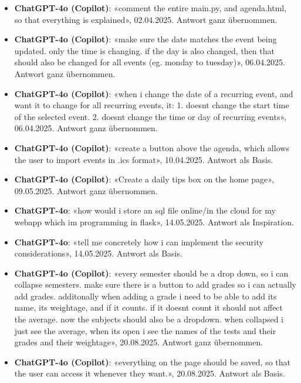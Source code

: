 \documentclass[12pt, a4paper]{article}
\begin{document}
\begin{itemize}
    \item \textbf{ChatGPT-4o (Copilot)}: «comment the entire main.py, and agenda.html, so that everything is explained», 02.04.2025. Antwort ganz übernommen.
    
    \item \textbf{ChatGPT-4o (Copilot)}: «make sure the date matches the event being updated. only the time is changing. if the day is also changed, then that should also be changed for all events (eg. monday to tuesday)», 06.04.2025. Antwort ganz übernommen.
    
    \item \textbf{ChatGPT-4o (Copilot)}: «when i change the date of a recurring event, and want it to change for all recurring events, it: 1. doesnt change the start time of the selected event. 2. doesnt change the time or day of recurring events», 06.04.2025. Antwort ganz übernommen.
    
    \item \textbf{ChatGPT-4o (Copilot)}: «create a button above the agenda, which allows the user to import events in .ics format», 10.04.2025. Antwort als Basis.
    
    \item \textbf{ChatGPT-4o (Copilot)}: «Create a daily tips box on the home page», 09.05.2025. Antwort ganz übernommen.
    
    \item \textbf{ChatGPT-4o}: «how would i store an sql file online/in the cloud for my webapp which im programming in flask», 14.05.2025. Antwort als Inspiration.
    
    \item \textbf{ChatGPT-4o}: «tell me concretely how i can implement the security considerations», 14.05.2025. Antwort als Basis.
    
    \item \textbf{ChatGPT-4o (Copilot)}: «every semester should be a drop down, so i can collapse semesters. make sure there is a button to add grades so i can actually add grades. additonally when adding a grade i need to be able to add its name, its weightage, and if it counts. if it doesnt count it should not affect the average. now the subjects should also be a dropdown. when collapsed i just see the average, when its open i see the names of the tests and their grades and their weightage», 20.08.2025. Antwort ganz übernommen.
    
    \item \textbf{ChatGPT-4o (Copilot)}: «everything on the page should be saved, so that the user can access it whenever they want.», 20.08.2025. Antwort als Basis.
    

\end{itemize}
\end{document}

